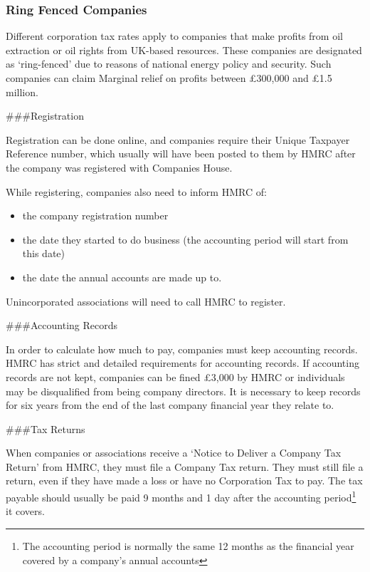 \documentclass[]{tufte-handout}
\providecommand{\tightlist}{%
  \setlength{\itemsep}{0pt}\setlength{\parskip}{0pt}}
\begin{document}
\hypertarget{ring-fenced-companies}{%
\subsubsection{Ring Fenced Companies}\label{ring-fenced-companies}}

Different corporation tax rates apply to companies that make profits
from oil extraction or oil rights from UK-based resources. These
companies are designated as `ring-fenced' due to reasons of national
energy policy and security. Such companies can claim Marginal relief on
profits between £300,000 and £1.5 million.

\#\#\#Registration

Registration can be done online, and companies require their Unique
Taxpayer Reference number, which usually will have been posted to them
by HMRC after the company was registered with Companies House.

While registering, companies also need to inform HMRC of:

\begin{itemize}
\tightlist
\item
  the company registration number
\item
  the date they started to do business (the accounting period will start
  from this date)
\item
  the date the annual accounts are made up to.
\end{itemize}

Unincorporated associations will need to call HMRC to register.

\#\#\#Accounting Records

In order to calculate how much to pay, companies must keep accounting
records. HMRC has strict and detailed requirements for accounting
records. If accounting records are not kept, companies can be fined
£3,000 by HMRC or individuals may be disqualified from being company
directors. It is necessary to keep records for six years from the end of
the last company financial year they relate to.

\#\#\#Tax Returns

When companies or associations receive a `Notice to Deliver a Company
Tax Return' from HMRC, they must file a Company Tax return. They must
still file a return, even if they have made a loss or have no
Corporation Tax to pay. The tax payable should usually be paid 9 months
and 1 day after the accounting period\footnote{The accounting period is
  normally the same 12 months as the financial year covered by a
  company's annual accounts} it covers.
\end{document}
